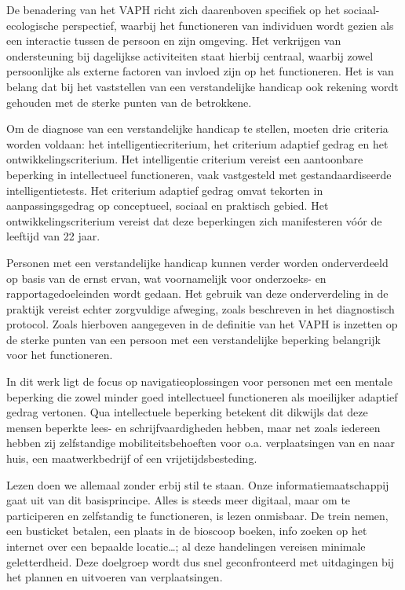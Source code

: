 De benadering van het VAPH richt zich daarenboven specifiek op het sociaal- ecologische perspectief, waarbij het functioneren van individuen wordt gezien als een interactie tussen de persoon en zijn omgeving. Het verkrijgen van ondersteuning bij dagelijkse activiteiten staat hierbij centraal, waarbij zowel persoonlijke als externe factoren van invloed zijn op het functioneren. Het is van belang dat bij het vaststellen van een verstandelijke handicap ook rekening wordt gehouden met de sterke punten van de betrokkene. 

Om de diagnose van een verstandelijke handicap te stellen, moeten drie criteria worden voldaan: het intelligentiecriterium, het criterium adaptief gedrag en het ontwikkelingscriterium. Het intelligentie criterium vereist een aantoonbare beperking in intellectueel functioneren, vaak vastgesteld met gestandaardiseerde intelligentietests. Het criterium adaptief gedrag omvat tekorten in aanpassingsgedrag op conceptueel, sociaal en praktisch gebied. Het ontwikkelingscriterium vereist dat deze beperkingen zich manifesteren vóór de leeftijd van 22 jaar. 

Personen met een verstandelijke handicap kunnen verder worden onderverdeeld op basis van de ernst ervan, wat voornamelijk voor on\-der\-zoeks- en rapportagedoeleinden wordt gedaan. Het gebruik van deze onderverdeling in de praktijk vereist echter zorgvuldige afweging, zoals beschreven in het diagnostisch protocol. Zoals hierboven aangegeven in de definitie van het VAPH is inzetten op de sterke punten van een persoon met een verstandelijke beperking belangrijk voor het functioneren.

In dit werk ligt de focus op navigatieoplossingen voor personen met een mentale beperking die zowel minder goed intellectueel functioneren als moeilijker adaptief gedrag vertonen. Qua intellectuele beperking betekent dit dikwijls dat deze mensen beperkte lees- en schrijfvaardigheden hebben, maar net zoals iedereen hebben zij zelfstandige mobiliteitsbehoeften voor o.a. verplaatsingen van en naar huis, een maatwerkbedrijf of een vrijetijdsbesteding.

Lezen doen we allemaal zonder erbij stil te staan. Onze informatiemaatschappij gaat uit van dit basisprincipe. Alles is steeds meer digitaal, maar om te participeren en zelfstandig te functioneren, is lezen onmisbaar. De trein nemen, een busticket betalen, een plaats in de bioscoop boeken, info zoeken op het internet over een bepaalde locatie\ldots; al deze handelingen vereisen minimale geletterdheid. Deze doelgroep wordt dus snel geconfronteerd met uitdagingen bij het plannen en uitvoeren van verplaatsingen. 

